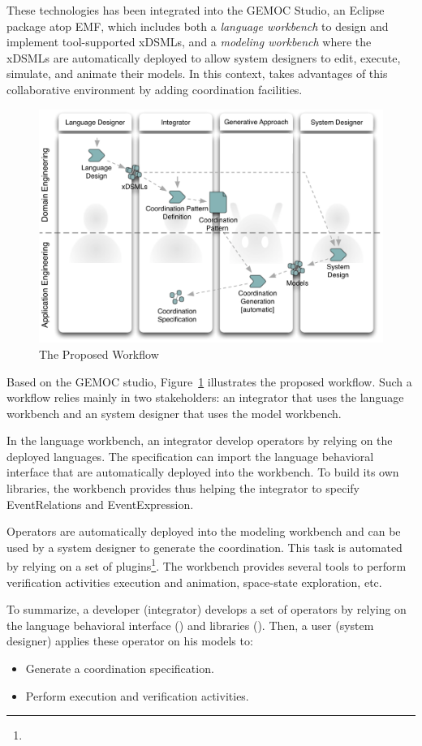 These technologies has been integrated into the GEMOC Studio, an Eclipse package atop EMF, which includes both a \emph{language workbench} to design and implement tool-supported xDSMLs, and a \emph{modeling workbench} where the xDSMLs are automatically deployed to allow system designers to edit, execute, simulate, and animate their models. In this context, \bcool takes advantages of this collaborative environment by adding coordination facilities. 

\begin{figure}[h]
	\begin{center}
		\includegraphics[width=.6\textwidth]{bcool/figs/process}
		\caption{The Proposed Workflow}
		\label{fig:proposedworkflow}
	\end{center}
\end{figure}

Based on the GEMOC studio, Figure~\ref{fig:proposedworkflow} illustrates the proposed workflow. Such a workflow relies mainly in two stakeholders: an integrator that uses the language workbench and an system designer that uses the model workbench. 

In the language workbench, an integrator develop operators by relying on the deployed languages. The \bcool specification can import the language behavioral interface that are automatically deployed into the workbench. To build its own libraries, the workbench provides \moccml thus helping the integrator to specify EventRelations and EventExpression. 

Operators are automatically deployed into the modeling workbench and can be used by a system designer to generate the coordination. This task is automated by relying on a set of plugins\footnote{}. The workbench provides several tools to perform verification activities \eg execution and animation, space-state exploration, etc.  

To summarize, a \bcool developer (\ie integrator) develops a set of operators by relying on the language behavioral interface (\ecl) and libraries (\moccml). Then, a \bcool user (\ie system designer) applies these operator on his models to: 
		\begin{itemize}
			\item Generate a coordination specification.
			\item Perform execution and verification activities.
		\end{itemize}

